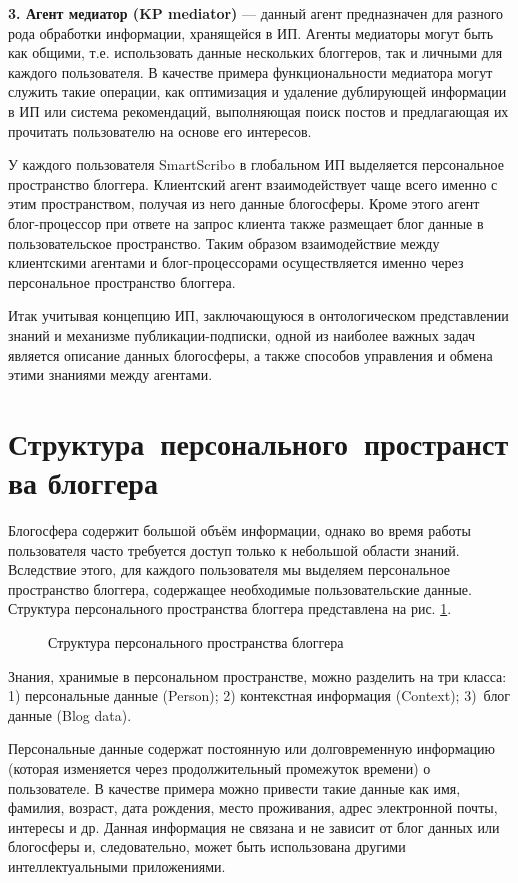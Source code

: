 {\bf 3. Агент медиатор (KP mediator)} --- данный агент предназначен для разного рода
обработки информации, хранящейся в ИП.
Агенты медиаторы могут быть как общими, т.е. использовать данные нескольких блоггеров, так и личными для каждого пользователя. В качестве примера функциональности медиатора могут служить такие операции, как оптимизация и удаление дублирующей информации в ИП или система рекомендаций, выполняющая поиск постов и предлагающая их прочитать пользователю на основе его интересов.

У каждого пользователя SmartScribo в глобальном ИП выделяется персональное пространство блоггера. Клиентский агент взаимодействует чаще всего именно с этим пространством, получая из него данные блогосферы.
Кроме этого агент блог-процессор при ответе на запрос клиента также размещает блог данные в пользовательское пространство. Таким образом взаимодействие между клиентскими агентами и блог-процессорами осуществляется именно через персональное пространство блоггера.

Итак учитывая концепцию ИП, заключающуюся в онтологическом представлении знаний и механизме публикации-подписки, одной из наиболее важных задач является описание данных блогосферы, а также способов управления и обмена этими знаниями между агентами.

\section{\hbox{Структура персонального пространства} \hbox{блоггера}}

Блогосфера содержит большой объём информации, однако во время работы пользователя часто требуется доступ только к небольшой области знаний. Вследствие этого, для каждого пользователя мы выделяем персональное пространство блоггера, содержащее необходимые пользовательские данные.
Структура персонального пространства блоггера представлена на рис. \ref{personal-struct}. 

\begin{figure}[h]
\centerline{
}
\caption{Структура персонального пространства блоггера}
\label{personal-struct}
\end{figure}

Знания, хранимые в персональном пространстве, можно разделить на три класса: 1) персональные данные (Person); 2) контекстная информация (Context); 3)~блог данные (Blog data).

Персональные данные содержат постоянную или долговременную информацию (которая изменяется через продолжительный промежуток времени) о пользователе. В качестве примера можно привести такие данные как имя, фамилия, возраст, дата рождения, место проживания, адрес электронной почты, интересы и др.
Данная информация не связана и не зависит от блог данных или блогосферы и, следовательно, может быть использована другими интеллектуальными приложениями.

